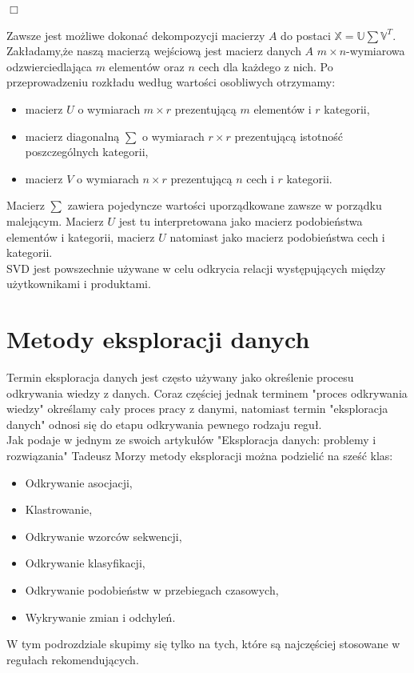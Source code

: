 \documentclass[12pt,a4paper]{report}
\begin{document}
\begin{flushright}
$\Box$
\end{flushright}
\bigskip
\bigskip
Zawsze jest możliwe dokonać dekompozycji macierzy $A$ do postaci $\mathbb{X}=\mathbb{U}\sum \mathbb{V}^T$.
\\Zakładamy,że naszą macierzą wejściową jest macierz danych $A$ $m \times n$-wymiarowa odzwierciedlająca $m$ elementów oraz $n$ cech dla każdego z nich. Po przeprowadzeniu rozkładu według wartości osobliwych otrzymamy:
\begin{itemize}
\item macierz $U$ o wymiarach $m \times r$ prezentującą $m$ elementów i $r$ kategorii,
\item macierz diagonalną $\sum$ o wymiarach $r \times r$ prezentującą istotność poszczególnych kategorii,
\item macierz $V$ o wymiarach $n \times r$ prezentującą $n$ cech i $r$ kategorii.
\end{itemize}
Macierz $\sum$ zawiera pojedyncze wartości uporządkowane zawsze w porządku malejącym. Macierz $U$ jest tu interpretowana jako macierz podobieństwa elementów i kategorii, macierz $U$ natomiast jako macierz podobieństwa cech i kategorii. 
\\SVD jest powszechnie używane w celu odkrycia relacji występujących między użytkownikami i produktami.
\section{Metody eksploracji danych}
Termin eksploracja danych jest często używany jako określenie procesu odkrywania wiedzy z danych. Coraz częściej jednak terminem  "proces odkrywania wiedzy" określamy cały proces pracy z danymi, natomiast termin "eksploracja danych" odnosi się do etapu odkrywania pewnego rodzaju reguł.
\\Jak podaje w jednym ze swoich artykułów "Eksploracja danych: problemy i rozwiązania" Tadeusz Morzy metody eksploracji można podzielić na sześć klas:
\begin{itemize}
\item Odkrywanie asocjacji,
\item Klastrowanie,
\item Odkrywanie wzorców sekwencji,
\item Odkrywanie klasyfikacji,
\item Odkrywanie podobieństw w przebiegach czasowych,
\item Wykrywanie zmian i odchyleń.
\end{itemize}
W tym podrozdziale skupimy się tylko na tych, które są najczęściej stosowane w regułach rekomendujących.
\end{document}
